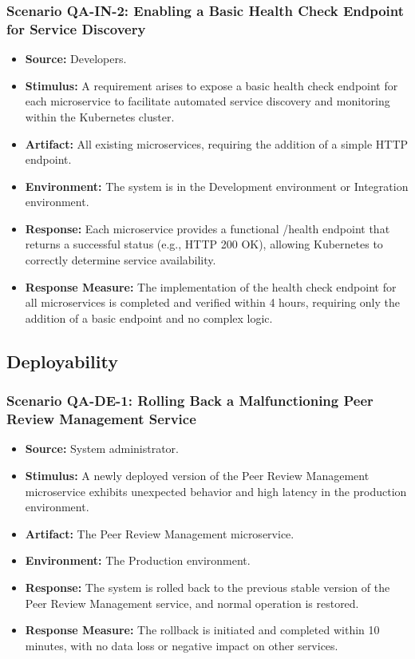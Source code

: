 \subsubsection{Scenario QA-IN-2: Enabling a Basic Health Check Endpoint for Service Discovery}
\begin{itemize}
    \item \textbf{Source:} Developers.
    \item \textbf{Stimulus:} A requirement arises to expose a basic health check endpoint for each microservice to facilitate automated service discovery and monitoring within the Kubernetes cluster.
    \item \textbf{Artifact:} All existing microservices, requiring the addition of a simple HTTP endpoint.
    \item \textbf{Environment:} The system is in the Development environment or Integration environment.
    \item \textbf{Response:} Each microservice provides a functional /health endpoint that returns a successful status (e.g., HTTP 200 OK), allowing Kubernetes to correctly determine service availability.
    \item \textbf{Response Measure:} The implementation of the health check endpoint for all microservices is completed and verified within 4 hours, requiring only the addition of a basic endpoint and no complex logic.
\end{itemize}

\subsection{Deployability}

\subsubsection{Scenario QA-DE-1: Rolling Back a Malfunctioning Peer Review Management Service}
\begin{itemize}
    \item \textbf{Source:} System administrator.
    \item \textbf{Stimulus:} A newly deployed version of the Peer Review Management microservice exhibits unexpected behavior and high latency in the production environment.
    \item \textbf{Artifact:} The Peer Review Management microservice.
    \item \textbf{Environment:} The Production environment.
    \item \textbf{Response:} The system is rolled back to the previous stable version of the Peer Review Management service, and normal operation is restored.
    \item \textbf{Response Measure:} The rollback is initiated and completed within 10 minutes, with no data loss or negative impact on other services.
\end{itemize}

